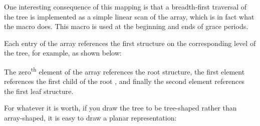 One interesting consequence of this mapping is that a breadth-first
traversal of the tree is implemented as a simple linear scan of the
array, which is in fact what the 
macro does.
This macro is used at the beginning and ends of grace
periods.

Each entry of the  array references the first 
structure on the corresponding level of the tree, for example, as shown
below:

\begin{center}
\end{center}

The zero\textsuperscript{th} element of the array references the root
 structure, the first element references the first child of
the root , and finally the second element references the
first leaf  structure.

For whatever it is worth, if you draw the tree to be tree-shaped rather
than array-shaped, it is easy to draw a planar representation:

\begin{center}
\end{center}


